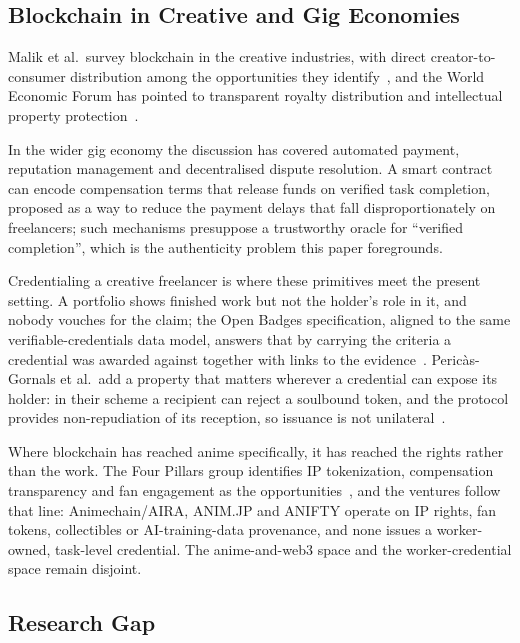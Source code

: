 \subsection{Blockchain in Creative and Gig Economies}
\label{subsec:blockchain_creative}

Malik et al.\ survey blockchain in the creative industries, with direct
creator-to-consumer distribution among the opportunities they
identify~\cite{blockchain_creative2023}, and the World Economic Forum has pointed to
transparent royalty distribution and intellectual property
protection~\cite{wef2017creative}.

In the wider gig economy the discussion has covered automated payment, reputation
management and decentralised dispute resolution. A smart contract can encode compensation
terms that release funds on verified task completion, proposed as a way to reduce the
payment delays that fall disproportionately on freelancers; such mechanisms presuppose a
trustworthy oracle for ``verified completion'', which is the authenticity problem this
paper foregrounds.

Credentialing a creative freelancer is where these primitives meet the present
setting. A portfolio shows finished work but not the holder's role in it, and nobody
vouches for the claim; the Open Badges specification, aligned to the same
verifiable-credentials data model, answers that by carrying the criteria a credential
was awarded against together with links to the evidence~\cite{openbadges3}.
Peric\`as-Gornals et al.\ add a property that matters wherever a credential can expose
its holder: in their scheme a recipient can reject a soulbound token, and the protocol
provides non-repudiation of its reception, so issuance is not
unilateral~\cite{sbt_credentials_digital2024}.

Where blockchain has reached anime specifically, it has reached the rights rather
than the work. The Four Pillars group identifies IP tokenization, compensation
transparency and fan engagement as the opportunities~\cite{fourpillars2025anime}, and
the ventures follow that line: Animechain/AIRA, ANIM.JP and ANIFTY operate on IP
rights, fan tokens, collectibles or AI-training-data provenance, and none issues a
worker-owned, task-level credential. The anime-and-web3 space and the
worker-credential space remain disjoint.

\subsection{Research Gap}
\label{subsec:gap}

